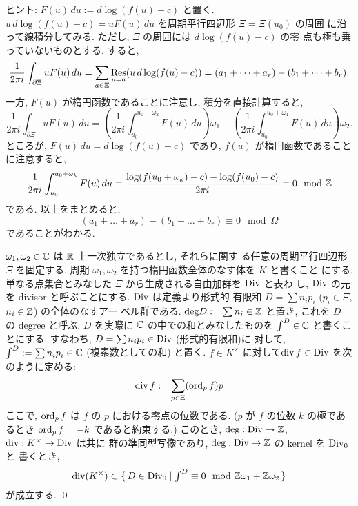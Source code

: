\documentclass[12pt,twoside]{jarticle}
\def\Div{{\text{\rm Div}}}
\def\deg{{\text{\rm deg}}}
\def\bdr{\partial}
\def\Z{{\Bbb Z}} %
\def\R{{\Bbb R}} %
\def\C{{\Bbb C}} %
\def\Res{\mathop{\text{\rm Res}}} %
\def\ord{\mathop{\text{\rm ord}}\nolimits} %
\def\div{\mathop{\text{\rm div}}\nolimits}
\begin{document}
\noindent ヒント: $F(u)\,du:=d\log(f(u)-c)$ と置く. %
$u\,d\log(f(u)-c)= u F(u)\,du$ を周期平行四辺形 $\Xi=\Xi(u_0)$ の周囲
に沿って線積分してみる. ただし, $\Xi$ の周囲には $d\log(f(u)-c)$ の零
点も極も乗っていないものとする. すると,
\[
  \frac{1}{2\pi i}\int_{\bdr\Xi} u F(u)\,du
  = \sum_{a\in\Xi} \Res_{u=a}(u\,d\log(f(u)-c))
  = (a_1 + \dots + a_r) - (b_1 + \dots + b_r).
\]
一方, $F(u)$ が楕円函数であることに注意し, 積分を直接計算すると,
\[
  \frac{1}{2\pi i}\int_{\bdr\Xi} u F(u)\,du
  = 
  \left(
    \frac{1}{2\pi i} \int_{u_0}^{u_0+\omega_2} F(u)\,du
  \right) \omega_1
  -
  \left(
    \frac{1}{2\pi i} \int_{u_0}^{u_0+\omega_1} F(u)\,du
  \right) \omega_2.
\] %
ところが, $F(u)\,du=d\log(f(u)-c)$ であり, $f(u)$ が楕円函数であること
に注意すると, 
\[
  \frac{1}{2\pi i}\int_{u_0}^{u_0+\omega_k} F(u)\,du 
  \equiv \frac{\log(f(u_0+\omega_k) -c) - \log(f(u_0) - c)}{2\pi i}
  \equiv 0
  \mod \Z
\]
である. 以上をまとめると,
\[
  (a_1 + \dots + a_r) - (b_1 + \dots + b_r)
  \equiv 0 
  \mod \Omega
\]
であることがわかる.

\medskip


\begin{question}
  $\omega_1,\omega_2\in\C$ は $\R$ 上一次独立であるとし, それらに関す
  る任意の周期平行四辺形 $\Xi$ を固定する. %
  周期 $\omega_1,\omega_2$ を持つ楕円函数全体のなす体を $K$ と書くこと
  にする. %
  単なる点集合とみなした $\Xi$ から生成される自由加群を $\Div$ と表わ
  し, $\Div$ の元を divisor と呼ぶことにする. $\Div$ は定義より形式的
  有限和 $D = \sum n_i p_i$ ($p_i\in\Xi$, $n_i\in\Z$) の全体のなすアー
  ベル群である. $\deg D := \sum n_i\in\Z$ と置き, これを $D$ の degree 
  と呼ぶ. $D$ を実際に $\C$ の中での和とみなしたものを $\int^D\in\C$ %
  と書くことにする. すなわち, $D=\sum n_i p_i\in\Div$ (形式的有限和)に
  対して, $\int^D := \sum n_i p_i\in\C$ (複素数としての和) と置く.  %
  $f\in K^{\times}$ に対して$\div f \in \Div$ を次のように定める:
  \[
    \div f := \sum_{p\in\Xi} (\ord_p f) p
  \] %
  ここで, $\ord_p f$ は $f$ の $p$ における零点の位数である. ($p$ が 
  $f$ の位数 $k$ の極であるとき $\ord_p f = -k$ であると約束する.)
  このとき, $\deg : \Div \to \Z$, $\div : K^{\times} \to \Div$ は共に
  群の準同型写像であり, $\deg : \Div \to \Z$ の kernel を $\Div_0$ と
  書くとき,
    \[
      \div(K^{\times})
      \subset
      \{\, D \in \Div_0 \mid
           \textstyle
           \int^D \equiv 0 \mod \Z\omega_1+\Z\omega_2 \,\}
    \]
  が成立する. \qed
\end{question}
\end{document}
